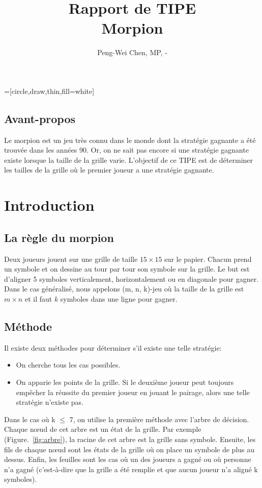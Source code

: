 \documentclass[12pt, a4paper]{article}
\title{Rapport de TIPE\\
Morpion}
\author{Peng-Wei Chen, MP, \oldstylenums{2017}-\oldstylenums{2018}}
\date{}
\begin{document}
\maketitle
{}=[circle,draw,thin,fill=white]

\subsection*{Avant-propos}
Le morpion est un jeu très connu dans le monde dont la stratégie gagnante a été trouvée dans les années 90. Or, on ne sait pas encore si une stratégie gagnante existe lorsque la taille de la grille varie. L'objectif de ce TIPE est de déterminer les tailles de la grille où le premier joueur a une stratégie gagnante.

\section{Introduction}
\subsection{La règle du morpion}
Deux joueurs jouent sur une grille de taille $15 \times 15$ sur le papier. Chacun prend un symbole et on dessine au tour par tour son symbole sur la grille. Le but est d'aligner 5 symboles verticalement, horizontalement ou en diagonale pour gagner.
Dans le cas généralisé, nous appelons (m, n, k)-jeu où la taille de la grille est $m \times n$ et il faut $k$ symboles dans une ligne pour gagner.

\subsection{Méthode}
Il existe deux méthodes pour déterminer s'il existe une telle stratégie:
\begin{itemize}
    \item On cherche tous les cas possibles.
    \item On apparie les points de la grille. Si le deuxième joueur peut toujours empêcher la réussite du premier joueur en jouant le pairage, alors une telle stratégie n'existe pas.
\end{itemize}

Dans le cas où k $\le$ 7, on utilise la première méthode avec l'arbre de décision. Chaque nœud de cet arbre est un état de la grille. Par exemple (\mbox{Figure. \ref{fig:arbre}}), la racine de cet arbre est la grille sans symbole. Ensuite, les fils de chaque nœud sont les états de la grille où on place un symbole de plus au dessus. Enfin, les feuilles sont les cas où un des joueurs a gagné ou où personne n'a gagné (c'est-à-dire que la grille a été remplie et que aucun joueur n'a aligné k symboles).
\end{document}
